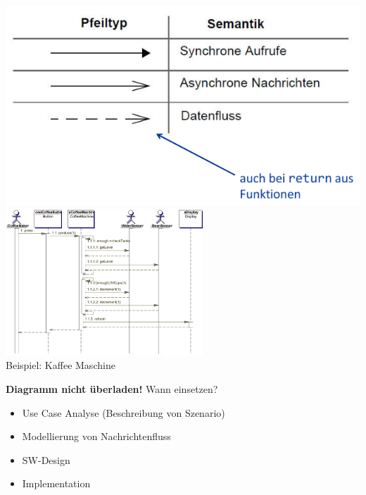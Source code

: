 \begin{multicols}{2}
	\includegraphics[width =\linewidth]{images/Modellierung/Pfeiltypen_Aktivitaetsdiagramm}
	\vfill\null
	\includegraphics[height=5.5cm]{images/Modellierung/Aktivitaetsdiagramm_Beispiel_Kaffee.png}\\
	{\centering Beispiel: Kaffee Maschine}
\end{multicols}


\begin{multicols}{2}
	\textbf{Diagramm nicht überladen!}
	\vfill\null
	\columnbreak
	Wann einsetzen?
	\begin{itemize}[noitemsep,topsep=0pt]
		\item Use Case Analyse (Beschreibung von Szenario)
		\item Modellierung von Nachrichtenfluss
		\item SW-Design
		\item Implementation
	\end{itemize}
\end{multicols}

\newpage
